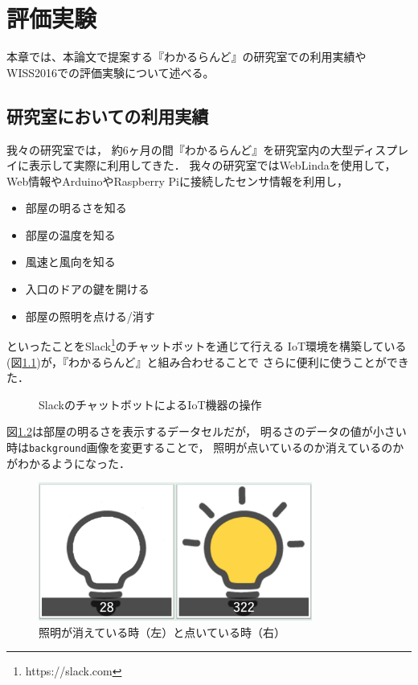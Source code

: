 \chapter{評価実験}
\label{chap:experiment}

本章では、本論文で提案する『わかるらんど』の研究室での利用実績や
WISS2016での評価実験について述べる。

\newpage

\section{研究室においての利用実績}
我々の研究室では，
約6ヶ月の間『わかるらんど』を研究室内の大型ディスプレイに表示して実際に利用してきた．
我々の研究室ではWebLindaを使用して，
Web情報やArduinoやRaspberry Piに接続したセンサ情報を利用し，
\begin{itemize}
\item 部屋の明るさを知る
\item 部屋の温度を知る
\item 風速と風向を知る
\item 入口のドアの鍵を開ける
\item 部屋の照明を点ける/消す
\end{itemize}
といったことをSlack\footnote{https://slack.com}のチャットボットを通じて行える
IoT環境を構築している(図\ref{slack})が，『わかるらんど』と組み合わせることで
さらに便利に使うことができた．

\begin{figure}[h]
\centering
{}
\caption{SlackのチャットボットによるIoT機器の操作}
\label{slack}
\end{figure}

図\ref{light}は部屋の明るさを表示するデータセルだが，
明るさのデータの値が小さい時は\texttt{background}画像を変更することで，
照明が点いているのか消えているのかがわかるようになった．

\begin{figure}[h]
\centering
\includegraphics[width=9cm]{images/light.png}
\caption{照明が消えている時（左）と点いている時（右）}
\label{light}
\end{figure}

